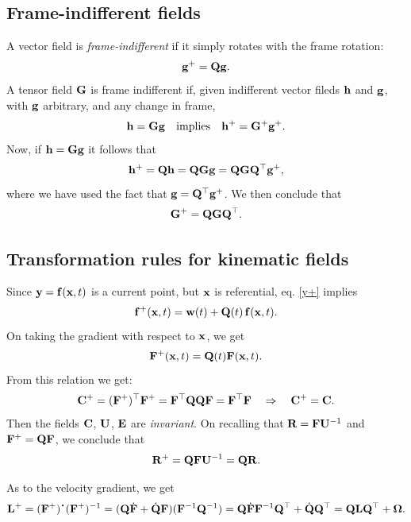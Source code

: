 \subsection{Frame-indifferent fields}
A vector field is \textit{frame-indifferent} if it simply rotates with the frame rotation:
\begin{equation}
	\mathbf{g}^+=\mathbf{Q}\mathbf{g}.
\end{equation}
A tensor field $\mathbf{G}$ is frame indifferent if, given indifferent vector fileds $\mathbf{h}$ and $\mathbf{g}$, with $\mathbf{g}$ arbitrary, and any change in frame,
\begin{equation}
	\mathbf{h}=\mathbf{G}\mathbf{g} \quad {\rm implies} \quad \mathbf{h}^+=\mathbf{G}^+\mathbf{g}^+.
\end{equation}
Now, if $\mathbf{h}=\mathbf{G}\mathbf{g}$ it follows that
\begin{equation}
	\mathbf{h}^+=\mathbf{Q}\mathbf{h}=\mathbf{Q}\mathbf{G}\mathbf{g}=\mathbf{Q}\mathbf{G}\mathbf{Q}^\top\mathbf{g}^+,
\end{equation}
where we have used the fact that $\mathbf{g}=\mathbf{Q}^\top\mathbf{g}^+$. We then conclude that
\begin{equation}
	\mathbf{G}^+=\mathbf{Q}\mathbf{G}\mathbf{Q}^\top.
\end{equation}

\subsection{Transformation rules for kinematic fields}
Since $\mathbf{y}=\mathbf{f}(\mathbf{x},t)$ is a current point, but $\mathbf{x}$ is referential, eq. \eqref{y+} implies
\begin{equation}
	\mathbf{f}^+(\mathbf{x},t)=\mathbf{w}(t)+\mathbf{Q}(t)\, \mathbf{f}(\mathbf{x},t) .
\end{equation}
On taking the gradient with respect to $\mathbf{x}$, we get
\begin{equation}
	\mathbf{F}^+(\mathbf{x},t)=\mathbf{Q}(t)\mathbf{F}(\mathbf{x},t).
\end{equation}
From this relation we get:
\begin{equation}
	\mathbf{C}^+=(\mathbf{F}^+)^\top\mathbf{F}^+=\mathbf{F}^\top \mathbf{Q} \mathbf{Q} \mathbf{F}=\mathbf{F}^\top\mathbf{F} \quad \Rightarrow \quad \mathbf{C}^+=\mathbf{C}.
\end{equation}
Then the fields $\mathbf{C}$, $\mathbf{U}$, $\mathbf{E}$ are \textit{invariant}.
On recalling that $\mathbf{R}=\mathbf{F}\mathbf{U}^{-1}$ and $\mathbf{F}^+=\mathbf{Q}\mathbf{F}$, we conclude that
\begin{equation}
	\mathbf{R}^+=\mathbf{Q}\mathbf{F}\mathbf{U}^{-1}=\mathbf{Q}\mathbf{R}.
\end{equation}



As to the velocity gradient, we get
\begin{equation}\label{Lb+}
	\Lb^+=(\Fb^+)^{\mathop{\vcenter{\hbox{\Large$\cdot$}}}}(\Fb^+)^{-1}=(\Qb\dot\Fb+\dot\Qb\Fb)(\Fb^{-1}\Qb^{-1})=\Qb \dot\Fb\Fb^{-1}\Qb^\top+\dot\Qb\Qb^\top=\Qb\Lb\Qb^\top+\Omegab.
\end{equation}

